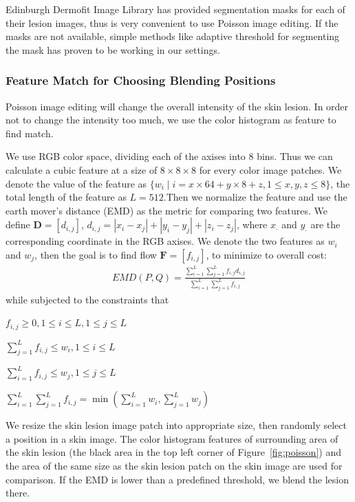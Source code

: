 \documentclass[letterpaper]{article}
\begin{document}
Edinburgh Dermofit Image Library has provided segmentation masks for each of their lesion images, thus is very convenient to use Poisson image editing. If the masks are not available, simple methods like adaptive threshold for segmenting the mask has proven to be working in our settings. 

\subsubsection{Feature Match for Choosing Blending Positions}

Poisson image editing will change the overall intensity of the skin lesion. In order not to change the intensity too much, we use the color histogram as feature to find match. 

We use RGB color space, dividing each of the axises into 8 bins. Thus we can calculate a cubic feature at a size of $8\times8\times8$ for every color image patches. We denote the value of the feature as $\{w_i\mid i = x\times64 + y\times8 + z, 1 \le x, y, z \le 8\}$, the total length of the feature as $L=512$.Then we normalize the feature and use the earth mover's distance (EMD) as the metric for comparing two features. We define $\mathbf{D} = [d_{i,j}]$, $d_{i,j} = |x_i - x_j| + |y_i - y_j| + |z_i - z_j|$, where $x_\cdot$ and $y_\cdot$ are the corresponding coordinate in the RGB axises. We denote the two features as ${w_i}$ and ${w_j}$, then the goal is to find flow $\mathbf{F} = [f_{i,j}]$, to minimize to overall cost:
\begin{align}
  EMD(P, Q) = \frac{\sum^L_{i=1}\sum^L_{j=1}f_{i,j}d_{i,j}}{\sum^L_{i=1}\sum^L_{j=1}f_{i,j}}
\end{align}
while subjected to the constraints that \par
$f_{i,j}\ge0, 1\le i\le L, 1\le j\le L$ \par
$\sum_{j=1}^L f_{i,j}\le w_i, 1\le i\le L$ \par
$\sum_{i=1}^L f_{i,j}\le w_j, 1\le j\le L$ \par
$\sum_{i=1}^L\sum_{j=1}^L f_{i,j} = \min(\sum_{i=1}^L w_i, \sum_{j=1}^L w_j)$

We resize the skin lesion image patch into appropriate size, then randomly select a position in a skin image. The color histogram features of surrounding area of the skin lesion (the black area in the top left corner of Figure~\ref{fig:poisson}) and the area of the same size as the skin lesion patch on the skin image are used for comparison. If the EMD is lower than a predefined threshold, we blend the lesion there.
\end{document}
